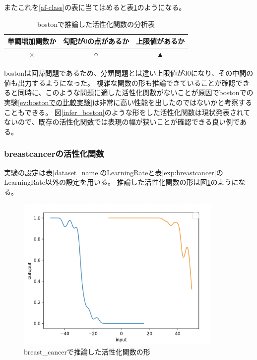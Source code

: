 またこれを\ref{af-class}の表に当てはめると表\ref{anal_boston}のようになる。
\begin{table}[htbp]
    \begin{center}
        \caption{bostonで推論した活性化関数の分析表}
        \label{anal_boston}
        \vspace{2mm} 
        \begin{tabular}{ |c|c|c| }
        \hline
        単調増加関数か & 勾配が$ 0 $の点があるか & 上限値があるか   \\
        \hline
        × & ○ & ▲   \\
        \hline
        \end{tabular}
    \end{center}
\end{table}


bostonは回帰問題であるため、分類問題とは違い上限値が30になり、その中間の値も出力するようになった。
複雑な関数の形も推論できていることが確認できると同時に、このような問題に適した活性化関数がないことが原因でbostonでの実験\ref{ev:bostonでの比較実験}は非常に高い性能を出したのではないかと考察することもできる。
図\ref{infer_boston}のような形をした活性化関数は現状発表されてないので、既存の活性化関数では表現の幅が狭いことが確認できる良い例である。





\subsubsection{breastcancerの活性化関数}
実験の設定は表\ref{dataset_name}のLearningRateと表\ref{exp:breastcancer}のLearningRate以外の設定を用いる。
推論した活性化関数の形は図\ref{infer_breastcancer}のようになる。
\begin{figure}[hbtp]
    \begin{center}
        \includegraphics[width=10cm]{asset/breastcancer-0.01.png}
            \caption{breast\_cancerで推論した活性化関数の形}
            \label{infer_breastcancer}
    \end{center}
\end{figure}

